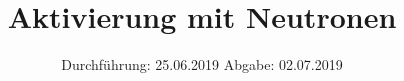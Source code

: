

\subject{V702}
\title{Aktivierung mit Neutronen}
\date{
  Durchführung: 25.06.2019
  \hspace{3em}
  Abgabe: 02.07.2019
}


\maketitle
\thispagestyle{empty}
\tableofcontents
\newpage

%

%




\nocite{*}
\printbibliography

